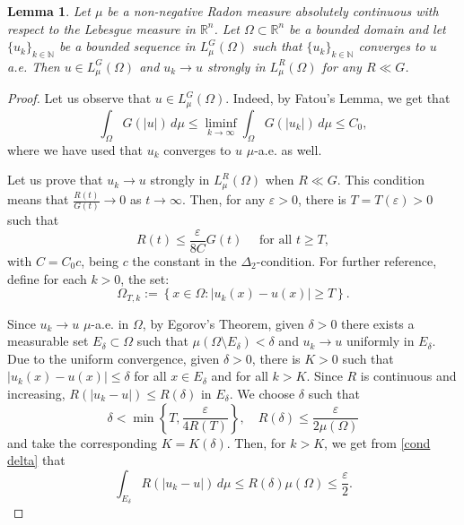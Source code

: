 \documentclass[leqno,twoside, 12pt]{amsart}
\theoremstyle{plain}
\numberwithin{equation}{section} \numberwithin{figure}{section}
\newtheorem{lemma}[theorem]{Lemma}
\theoremstyle{definition}
\numberwithin{equation}{section}
\newcommand{\R}{\mathbb{R}}
\newcommand{\N}{\mathbb{N}}
\begin{document}
\begin{lemma} \label{lemma.1}Let $\mu$ be a non-negative Radon measure absolutely continuous with respect to the Lebesgue measure in $\mathbb{R}^n$.
 Let $\Omega\subset \R^n$ be a bounded domain and let $\{u_k\}_{k \in \N}$ be a bounded sequence in $L_{\mu}^G(\Omega)$ such that $\{u_k\}_{k\in\N}$ converges to $u$ a.e. Then $u\in L_\mu^G(\Omega)$ and $u_k\to u$ strongly in $L_{\mu}^R(\Omega)$ for any $R\ll G$.
\end{lemma}
\begin{proof}
Let us observe that $u\in L_{\mu}^G(\Omega)$. Indeed, by Fatou's Lemma, we get that
$$
\int_\Omega G(|u|)\,d\mu \leq \liminf_{k\to\infty} \int_\Omega G(|u_k|)\,d\mu \leq C_0,
$$where we have used that $u_k$ converges to $u$ $\mu$-a.e. as well.

 
Let us prove that $u_k\to u$ strongly in $L_{\mu}^R(\Omega)$ when $R\ll G$. This condition means that 
$\frac{R(t)}{G(t)}\to 0$ as  $t\to\infty$. Then, for any $\varepsilon>0$, there is $T=T(\varepsilon)>0$ such that
\begin{equation}\label{R and G}
R(t)\leq \frac{\varepsilon}{8C} G(t) \quad \text{ for all } t \geq T,
\end{equation} 
with $C=C_0 c$, being $c$ the constant in the  $\Delta_2$-condition. For further reference, define for each $k>0$, the set:
$$\Omega_{T, k}:=\left\lbrace x\in \Omega: |u_k(x)-u(x)|\geq T \right\rbrace.$$

 Since $u_k\to u$ $\mu$-a.e. in $\Omega$, by Egorov's Theorem, given $\delta>0$ there exists a measurable set $E_\delta \subset \Omega$ such that $\mu(\Omega\setminus E_\delta)<\delta$ and $u_k\to u$ uniformly in $E_\delta$. Due to the uniform convergence, given $\delta>0$, there is $K>0$ such that $|u_k(x)-u(x)|\leq \delta$ for all $x\in E_\delta$ and for all $k>K$. Since $R$ is continuous and increasing, $R(|u_k-u|)\leq R(\delta)$ in $E_{\delta}$. We choose $\delta$ such that 
\begin{equation}\label{cond delta}
\delta<\min\left\lbrace T,\dfrac{ \varepsilon}{4R(T)}\right\rbrace, \quad R(\delta)\leq \frac{\varepsilon}{2\mu(\Omega)}
\end{equation}and take the corresponding $K=K(\delta)$. Then, for $k> K$, we get from \eqref{cond delta} that
$$
\int_{E_{\delta}} R(|u_k-u|)\,d\mu \leq R(\delta)\mu(\Omega)\leq \frac{\varepsilon}{2}.
$$


\end{proof}
\end{document}
